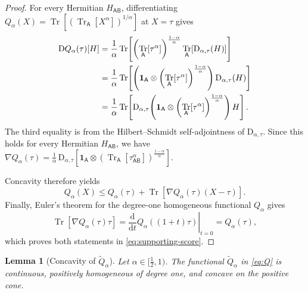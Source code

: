 \documentclass[11pt,reqno]{amsart}
\newtheorem{lemma}[lemma]{Lemma}
\theoremstyle{definition}
\DeclareMathOperator{\Tr}{Tr}
\newcommand{\I}{\mathbf 1}
\newcommand{\A}{\mathsf{A}}
\newcommand{\B}{\mathsf{B}}
\newcommand{\dd}{\mathrm d}
\newcommand{\sand}{\widetilde}
\begin{document}
\begin{proof}
For every Hermitian \(H_{\A\B}\), differentiating
\(
Q_\alpha(X)=\Tr[(\Tr_{\A}[X^\alpha])^{1/\alpha}]
\)
at \(X=\tau\) gives
\begin{align}
 \mathrm DQ_\alpha(\tau)[H]
 &=
 \frac1\alpha
 \Tr\!\left[
 \left(\Tr_{\A}[\tau^\alpha]\right)^{\frac{1-\alpha}{\alpha}}
 \Tr_{\A}\!\left[\mathrm D_{\alpha,\tau}(H)\right]
 \right]
 \notag\\
 &=
 \frac1\alpha
 \Tr\!\left[
 \left(\I_{\A}\otimes
  \left(\Tr_{\A}[\tau^\alpha]\right)^{\frac{1-\alpha}{\alpha}}\right)
 \mathrm D_{\alpha,\tau}(H)
 \right]
 \notag\\
 &=
 \frac1\alpha
 \Tr\!\left[
 \mathrm D_{\alpha,\tau}\!\left(
 \I_{\A}\otimes
  \left(\Tr_{\A}[\tau^\alpha]\right)^{\frac{1-\alpha}{\alpha}}
 \right)H
 \right].
 \label{eq:gradient-calculation-general}
\end{align}
The third equality is from the Hilbert--Schmidt self-adjointness of
\(\mathrm D_{\alpha,\tau}\).
Since this holds for every Hermitian $H_{\A\B}$, we have $\nabla Q_{\alpha}(\tau)
 =\frac1\alpha\,
 \mathrm D_{\alpha,\tau}
 \!\left[
 \I_{\A}\otimes
 \left(\Tr_{\A}[\tau_{\A\B}^{\alpha}]\right)^{\frac{1-\alpha}{\alpha}}
 \right]$.
 
Concavity therefore yields
\[
 Q_\alpha(X)\leq Q_\alpha(\tau)+\Tr[\nabla Q_{\alpha}(\tau)(X-\tau)].
\]
Finally, Euler's theorem for the degree-one homogeneous functional $Q_\alpha$
gives
\[
 \Tr[\nabla Q_{\alpha}(\tau)\tau]
 =\left.\frac{\dd}{\dd t}Q_\alpha((1+t)\tau)\right|_{t=0}
 =Q_\alpha(\tau),
\]
which proves both statements in \cref{eq:supporting-score}.
\end{proof}

\begin{lemma}[Concavity of $\sand Q_{\alpha}$]
\label{lem:concavity}
Let $\alpha\in[\frac12,1)$.  The functional $\sand Q_{\alpha}$ in
\cref{eq:Q} is continuous, positively homogeneous of degree one, and
concave on the positive cone.
\end{lemma}
\end{document}

